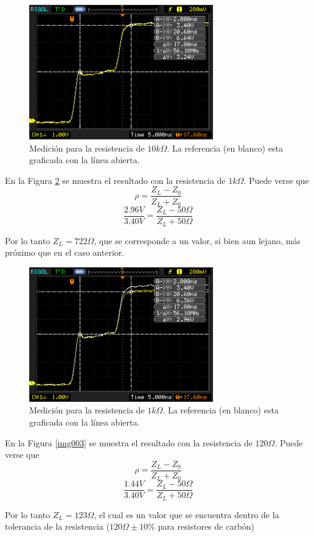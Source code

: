 \documentclass[a4paper,10pt]{article}
\begin{document}
		\begin{figure}[!htb]
			\centering
			\includegraphics[width=8cm]
			{Imagenes/Res10k.png}
			\caption{Medici\'on para la resistencia de $10k\Omega$. La 
			referencia (en blanco) esta graficada con la l\'inea abierta.}
			\label{img001} 
		\end{figure}

	\indent En la Figura \ref{img002} se muestra el resultado con la 
	resistencia de $1k\Omega$. Puede verse que 
	$$\rho=\frac{Z_L-Z_0}{Z_L+Z_0}$$
	$$\frac{2.96V}{3.40V}=\frac{Z_L- 50\Omega}{Z_L+50\Omega}$$
	
	\indent Por lo tanto $Z_L=722\Omega$, que se corresponde a un valor, si 
	bien aun lejano, m\'as pr\'oximo que en el caso anterior.
		
		\begin{figure}[!htb]
			\centering
			\includegraphics[width=8cm]
			{Imagenes/Res1k.png}
			\caption{Medici\'on para la resistencia de $1k\Omega$. La 
			referencia (en blanco) esta graficada con la l\'inea abierta.}
			\label{img002} 
		\end{figure}

	\indent En la Figura \ref{img003} se muestra el resultado con la 
	resistencia de $120\Omega$. Puede verse que 
	$$\rho=\frac{Z_L-Z_0}{Z_L+Z_0}$$
	$$\frac{1.44V}{3.40V}=\frac{Z_L- 50\Omega}{Z_L+50\Omega}$$
	
	\indent Por lo tanto $Z_L=123\Omega$, el cual es un valor que se encuentra
	dentro de la tolerancia de la resistencia ($120\Omega \pm 10\%$
	para resistores de carb\'on)	
\end{document}
